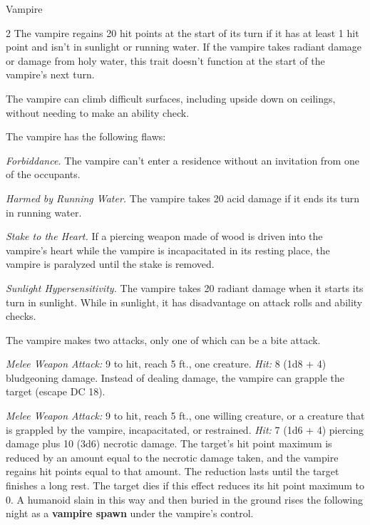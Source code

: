 \documentclass[10pt,a4paper,twoside,bg=print,twocolumn,openany,nodeprecatedcode]{dndbook}
\begin{document}
\begin{DndMonster}[float*=b,width=\textwidth + 8pt]{Vampire}
\begin{multicols}{2}
The vampire regains 20 hit points at the start of its turn if it has at least 1 hit point and isn't in sunlight or running water. If the vampire takes radiant damage or damage from holy water, this trait doesn't function at the start of the vampire's next turn.

The vampire can climb difficult surfaces, including upside down on ceilings, without needing to make an ability check.

The vampire has the following flaws:

\textit{Forbiddance.} The vampire can't enter a residence without an invitation from one of the occupants.

\textit{Harmed by Running Water.} The vampire takes 20 acid damage if it ends its turn in running water.

\textit{Stake to the Heart.} If a piercing weapon made of wood is driven into the vampire's heart while the vampire is incapacitated in its resting place, the vampire is paralyzed until the stake is removed.

\textit{Sunlight Hypersensitivity.} The vampire takes 20 radiant damage when it starts its turn in sunlight. While in sunlight, it has disadvantage on attack rolls and ability checks.

The vampire makes two attacks, only one of which can be a bite attack.

\textsl{Melee Weapon Attack:} 9 to hit, reach 5 ft., one creature. \textsl{Hit:} 8 (1d8 + 4) bludgeoning damage. Instead of dealing damage, the vampire can grapple the target (escape DC 18).

\textsl{Melee Weapon Attack:} 9 to hit, reach 5 ft., one willing creature, or a creature that is grappled by the vampire, incapacitated, or restrained. \textsl{Hit:} 7 (1d6 + 4) piercing damage plus 10 (3d6) necrotic damage. The target's hit point maximum is reduced by an amount equal to the necrotic damage taken, and the vampire regains hit points equal to that amount. The reduction lasts until the target finishes a long rest. The target dies if this effect reduces its hit point maximum to 0. A humanoid slain in this way and then buried in the ground rises the following night as a \textbf{vampire spawn} under the vampire's control.


\end{multicols}
\end{DndMonster}
\end{document}
